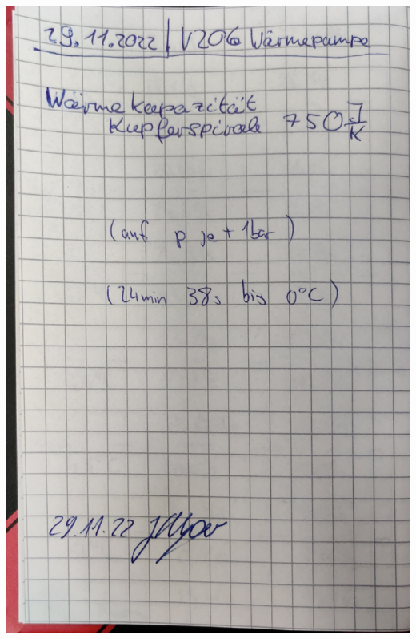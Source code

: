 \begin{minipage}[t]{0.45\textwidth}
    \includegraphics[width=\textwidth, page=3]{v206 Messdaten.pdf}
\end{minipage}